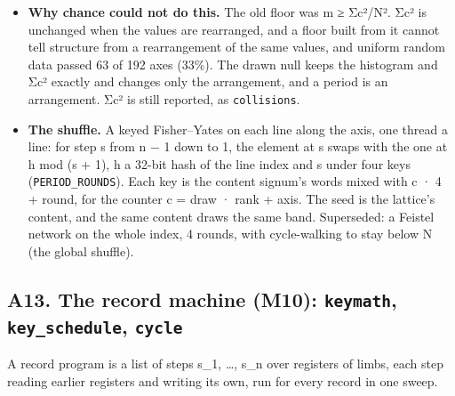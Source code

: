 \begin{itemize}
\item \textbf{Why chance could not do this.} The old floor was m ≥ Σc²/N². Σc² is unchanged when the values are rearranged, and a floor built from it cannot tell structure from a rearrangement of the same values, and uniform random data passed 63 of 192 axes (33\%). The drawn null keeps the histogram and Σc² exactly and changes only the arrangement, and a period is an arrangement. Σc² is still reported, as \texttt{collisions}.
\item \textbf{The shuffle.} A keyed Fisher–Yates on each line along the axis, one thread a line: for step s from n − 1 down to 1, the element at s swaps with the one at h mod (s + 1), h a 32-bit hash of the line index and s under four keys (\texttt{PERIOD\_\allowbreak{}ROUNDS}). Each key is the content signum's words mixed with c · 4 + round, for the counter c = draw · rank + axis. The seed is the lattice's content, and the same content draws the same band. Superseded: a Feistel network on the whole index, 4 rounds, with cycle-walking to stay below N (the global shuffle).
\end{itemize}

\subsection{\texorpdfstring{A13. The record machine (M10): \texttt{keymath}, \texttt{key\_\allowbreak{}schedule}, \texttt{cycle}}{A13. The record machine (M10): keymath, key\_schedule, cycle}}

A record program is a list of steps s\_\allowbreak{}1, …, s\_\allowbreak{}n over registers of limbs, each step reading earlier registers and writing its own, run for every record in one sweep.

